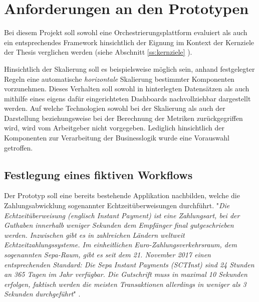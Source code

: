 \section{Anforderungen an den Prototypen}
\label{sec:anforderungProto}

Bei diesem Projekt soll sowohl eine Orchestrierungsplattform evaluiert als auch ein entsprechendes Framework hinsichtlich der Eignung im Kontext der Kernziele der Thesis verglichen werden (siehe Abschnitt \ref{ss:kernziele} ). 

Hinsichtlich der Skalierung soll es beispielsweise möglich sein, anhand festgelegter Regeln eine automatische \emph{horizontale} Skalierung bestimmter Komponenten vorzunehmen. Dieses Verhalten soll sowohl in hinterlegten Datensätzen als auch mithilfe eines eigens dafür eingerichteten Dashboards nachvollziehbar dargestellt werden. Auf welche Technologien sowohl bei der Skalierung als auch der Darstellung beziehungsweise bei der Berechnung der Metriken zurückgegriffen wird, wird vom Arbeitgeber nicht vorgegeben. Lediglich hinsichtlich der Komponenten zur Verarbeitung der Businesslogik wurde eine Vorauswahl getroffen. 



\subsection{Festlegung eines fiktiven Workflows}
\label{ss:fiktiverWorkflow}

Der Prototyp soll eine bereits bestehende Applikation nachbilden, welche die Zahlungsabwicklung sogenannter Echtzeitüberweisungen durchführt. "\emph{Die Echtzeitüberweisung (englisch Instant Payment) ist eine Zahlungsart, bei der Guthaben innerhalb weniger Sekunden dem Empfänger final gutgeschrieben werden. Inzwischen gibt es in zahlreichen Ländern weltweit Echtzeitzahlungssysteme. Im einheitlichen Euro-Zahlungsverkehrsraum, dem sogenannten Sepa-Raum, gibt es seit dem 21. November 2017 einen entsprechenden Standard: Die Sepa Instant Payments (SCTInst) sind 24 Stunden an 365 Tagen im Jahr verfügbar. Die Gutschrift muss in maximal 10 Sekunden erfolgen, faktisch werden die meisten Transaktionen allerdings in weniger als 3 Sekunden durchgeführt}" \cite{instpay-def}.

